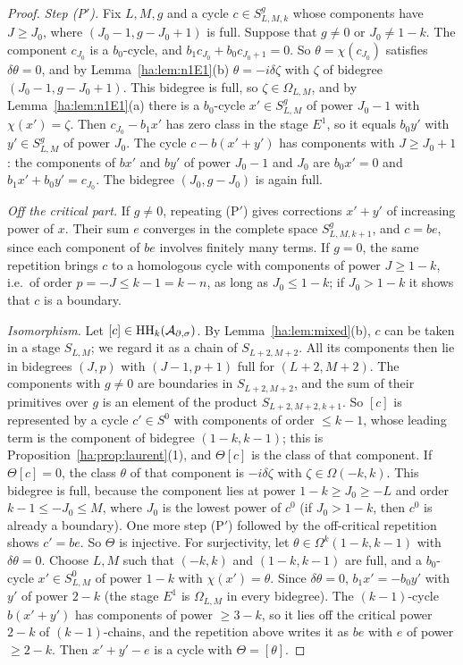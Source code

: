 \begin{proof}
\emph{Step (P\('\)).} Fix \(L,M,g\) and a cycle \(c\in S^g_{L,M,k}\) whose
components have \(J\ge J_0\), where \((J_0-1,g-J_0+1)\) is full. Suppose
that \(g\ne0\) or \(J_0\ne1-k\). The component \(c_{J_0}\) is a
\(b_0\)-cycle, and \(b_1c_{J_0}+b_0c_{J_0+1}=0\). So
\(\theta=\chi(c_{J_0})\) satisfies \(\delta\theta=0\), and by
Lemma~\ref{ha:lem:n1E1}(b) \(\theta=-i\delta\zeta\) with \(\zeta\) of
bidegree \((J_0-1,g-J_0+1)\). This bidegree is full, so \(\zeta\in
\Omega_{L,M}\), and by Lemma~\ref{ha:lem:n1E1}(a) there is a
\(b_0\)-cycle \(x'\in S^g_{L,M}\) of power \(J_0-1\) with
\(\chi(x')=\zeta\). Then \(c_{J_0}-b_1x'\) has zero class in the stage
\(E^1\), so it equals \(b_0y'\) with \(y'\in S^g_{L,M}\) of power \(J_0\).
The cycle \(c-b(x'+y')\) has components with \(J\ge J_0+1\): the
components of \(b x'\) and \(by'\) of power \(J_0-1\) and \(J_0\) are
\(b_0x'=0\) and \(b_1x'+b_0y'=c_{J_0}\). The bidegree
\((J_0,g-J_0)\) is again full.

\emph{Off the critical part.} If \(g\ne0\), repeating (P\('\)) gives
corrections \(x'+y'\) of increasing power of \(x\). Their sum \(e\)
converges in the complete space \(S^g_{L,M,k+1}\), and \(c=be\), since
each component of \(be\) involves finitely many terms. If \(g=0\), the
same repetition brings \(c\) to a homologous cycle with components of
power \(J\ge1-k\), i.e.\ of order \(p=-J\le k-1=k-n\), as long as
\(J_0\le1-k\); if \(J_0>1-k\) it shows that \(c\) is a boundary.

\emph{Isomorphism.} Let \([c]\in\operatorname{HH}_k(\mathcal A_{\partial,\sigma})\). By
Lemma~\ref{ha:lem:mixed}(b), \(c\) can be taken in a stage \(S_{L,M}\);
we regard it as a chain of \(S_{L+2,M+2}\). All its components then lie
in bidegrees \((J,p)\) with \((J-1,p+1)\) full for \((L+2,M+2)\). The
components with \(g\ne0\) are boundaries in \(S_{L+2,M+2}\), and the sum
of their primitives over \(g\) is an element of the product
\(S_{L+2,M+2,k+1}\). So \([c]\) is represented by a cycle \(c'\in S^0\)
with components of order \(\le k-1\), whose leading term is the
component of bidegree \((1-k,k-1)\); this is
Proposition~\ref{ha:prop:laurent}(1), and \(\Theta[c]\) is the class of
that component. If \(\Theta[c]=0\), the class \(\theta\) of that
component is \(-i\delta\zeta\) with \(\zeta\in\Omega(-k,k)\). This
bidegree is full, because the component lies at power \(1-k\ge J_0\ge-L\)
and order \(k-1\le-J_0\le M\), where \(J_0\) is the lowest power of
\(c^0\) (if \(J_0>1-k\), then \(c^0\) is already a boundary). One more step (P\('\)) followed by the off-critical repetition
shows \(c'=be\). So \(\Theta\) is injective. For surjectivity, let
\(\theta\in\Omega^k(1-k,k-1)\) with \(\delta\theta=0\). Choose \(L,M\) such
that \((-k,k)\) and \((1-k,k-1)\) are full, and a \(b_0\)-cycle
\(x'\in S^0_{L,M}\) of power \(1-k\) with \(\chi(x')=\theta\). Since
\(\delta\theta=0\), \(b_1x'=-b_0y'\) with \(y'\) of power \(2-k\) (the
stage \(E^1\) is \(\Omega_{L,M}\) in every bidegree). The \((k-1)\)-cycle
\(b(x'+y')\) has components of power \(\ge3-k\), so it lies off the
critical power \(2-k\) of \((k-1)\)-chains, and the repetition above
writes it as \(be\) with \(e\) of power \(\ge2-k\). Then \(x'+y'-e\) is a
cycle with \(\Theta=[\theta]\).


\end{proof}
